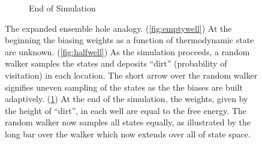 \documentclass[9pt,review]{livecoms}
\newcommand{\vx}{\mathbf{x}}
\providecommand{\DIFaddbegin}{} %
\providecommand{\DIFaddend}{} %
\providecommand{\DIFdelbegin}{} %
\providecommand{\DIFdelend}{} %
\newcommand{\DIFscaledelfig}{0.5}
\newlength{\DIFdelgraphicswidth} %
\newlength{\DIFdelgraphicsheight} %
\newcommand{\DIFaddincludegraphics}[2][]{{\color{blue}\fbox{\DIFOincludegraphics[#1]{#2}}}} %
\newcommand{\DIFdelincludegraphics}[2][]{%
\sbox{\DIFdelgraphicsbox}{\DIFOincludegraphics[#1]{#2}}%
\settoboxwidth{\DIFdelgraphicswidth}{\DIFdelgraphicsbox} %
\settoboxtotalheight{\DIFdelgraphicsheight}{\DIFdelgraphicsbox} %
\scalebox{\DIFscaledelfig}{%
\parbox[b]{\DIFdelgraphicswidth}{\usebox{\DIFdelgraphicsbox}\\[-\baselineskip] \rule{\DIFdelgraphicswidth}{0em}}\llap{\resizebox{\DIFdelgraphicswidth}{\DIFdelgraphicsheight}{%
\setlength{\unitlength}{\DIFdelgraphicswidth}%
\begin{picture}(1,1)%
\thicklines\linethickness{2pt} %
{\color[rgb]{1,0,0}\put(0,0){\framebox(1,1){}}}%
{\color[rgb]{1,0,0}\put(0,0){\line( 1,1){1}}}%
{\color[rgb]{1,0,0}\put(0,1){\line(1,-1){1}}}%
\end{picture}%
}\hspace*{3pt}}} %
} %
\DeclareRobustCommand{\DIFaddbegin}{\DIFOaddbegin \let\includegraphics\DIFaddincludegraphics} %
\DeclareRobustCommand{\DIFaddend}{\DIFOaddend \let\includegraphics\DIFOincludegraphics} %
\DeclareRobustCommand{\DIFdelbegin}{\DIFOdelbegin \let\includegraphics\DIFdelincludegraphics} %
\DeclareRobustCommand{\DIFdelend}{\DIFOaddend \let\includegraphics\DIFOincludegraphics} %
\begin{document}
\begin{figure}[ht]
\begin{subfigure}[b]{0.33\textwidth}
\caption{End of Simulation}
\label{fig:fullwell}
\end{subfigure}
\caption{The expanded ensemble hole analogy. (\ref{fig:emptywell}) At the beginning the biasing weights as a function of thermodynamic state are unknown. (\ref{fig:halfwell}) As the simulation proceeds, a random walker samples the states and deposits ``dirt'' (probability of visitation) in each location.  The short arrow over the random walker signifies uneven sampling of the states as the the biases are built adaptively.  (\ref{fig:fullwell}) At the end of the simulation, the weights, given by the height of ``dirt'', in each well are equal to the free energy.  The random walker now samples all states equally, as illustrated by the long bar over the walker which now extends over all of state space.} \label{fig:EXEanalogy}
\end{figure}

\DIFdelbegin %
\DIFdelend \DIFaddbegin 
\DIFaddend 
\end{document}
